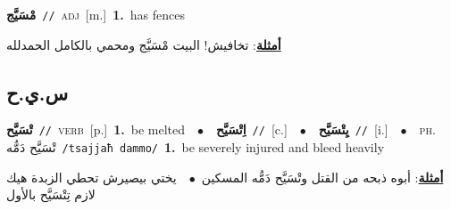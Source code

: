 \documentclass[10pt,a4paper,twoside]{article} %
\begin{document}
\begin{multicols}{2}
{\setlength\topsep{0pt}\textbf{\foreignlanguage{arabic}{مْسَيَّج}}\ {\color{gray}\texttt{//}\color{black}}\ \textsc{adj}\ [m.]\ \textbf{1.}~has fences\  \begin{flushright}\color{gray}\foreignlanguage{arabic}{\textbf{\underline{\foreignlanguage{arabic}{أمثلة}}}: تخافيش! البيت مْسَيَّج ومحمي بالكامل الحمدلله}\end{flushright}\color{black}} \vspace{2mm}

\vspace{-3mm}
\subsection*{\color{blue}\foreignlanguage{arabic}{س.ي.ح}\color{blue}{}} 

{\setlength\topsep{0pt}\textbf{\foreignlanguage{arabic}{تْسَيَّح}}\ {\color{gray}\texttt{//}\color{black}}\ \textsc{verb}\ [p.]\ \textbf{1.}~be melted\ \ $\bullet$\ \ \setlength\topsep{0pt}\textbf{\foreignlanguage{arabic}{اِتْسَيَّح}}\ {\color{gray}\texttt{//}\color{black}}\ [c.]\ \ $\bullet$\ \ \setlength\topsep{0pt}\textbf{\foreignlanguage{arabic}{يِتْسَيَّح}}\ {\color{gray}\texttt{//}\color{black}}\ [i.]\ \ $\bullet$\ \ \textsc{ph.} \color{gray} \foreignlanguage{arabic}{تْسَيَّح دَمُّه}\color{black}\ {\color{gray}\texttt{/{\sffamily tsajjaħ dammo}/}\color{black}}\ \textbf{1.}~be severely injured and bleed heavily\  \begin{flushright}\color{gray}\foreignlanguage{arabic}{\textbf{\underline{\foreignlanguage{arabic}{أمثلة}}}: أبوه ذبحه من القتل وتْسَيَّح دَمُّه المسكين\ $\bullet$\ \  يختي بيصيرش تحطي الزبدة هيك لازم تِتْسَيَّح بالأول}\end{flushright}\color{black}} \vspace{2mm}


\end{multicols}
\end{document}
